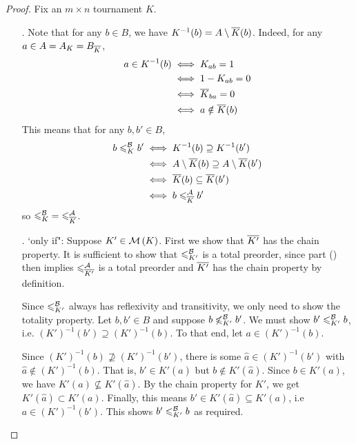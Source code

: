 \begin{proof}
    Fix an $m \times n$ tournament $K$.

    \begin{itemize}
    \item[\labelcref{tourn_item_dual_lemma_nle}.]
    Note that for any $b \in B$, we have $K^{-1}(b) = A \setminus {\overline{K}}(b)$.
    Indeed, for any $a \in A = A_K = B_{{\overline{K}}}$,
    \begin{align*}
        a \in K^{-1}(b)
        &\iff K_{ab} = 1 \\
        &\iff 1 - K_{ab} = 0 \\
        &\iff {\overline{K}}_{ba} = 0 \\
        &\iff a \notin {\overline{K}}(b)
    \end{align*}
    This means that for any $b, b' \in B$,
    \begin{align*}
        b \leqslant^{\mathcal{B}}_K b'
        &\iff K^{-1}(b) \supseteq K^{-1}(b') \\
        &\iff A \setminus {\overline{K}}(b) \supseteq A \setminus {\overline{K}}(b') \\
        &\iff {\overline{K}}(b) \subseteq {\overline{K}}(b') \\
        &\iff b \leqslant^{\mathcal{A}}_{{\overline{K}}} b'
    \end{align*}
    so ${\leqslant^{\mathcal{B}}_K} = {\leqslant^{\mathcal{A}}_{{\overline{K}}}}$.

    \item[\labelcref{tourn_item_dual_lemma_minch}.]
    `only if": Suppose $K' \in \operatorname{\mathcal{M}}\left({K}\right)$. First we show that ${\overline{K'}}$ has
    the chain property. It is sufficient to show that ${\leqslant^{\mathcal{B}}_{K'}}$ is a total
    preorder,\footnotemark{} since part ()
    then implies ${\leqslant^{\mathcal{A}}_{{\overline{K'}}}}$ is a total preorder and ${\overline{K'}}$ has
    the chain property by definition.


    Since ${\leqslant^{\mathcal{B}}_{K'}}$ always has reflexivity and transitivity, we only need
    to show the totality property. Let $b, b' \in B$ and suppose $b
    \not\leqslant^{\mathcal{B}}_{K'} b'$. We must show $b' \leqslant^{\mathcal{B}}_{K'} b$, i.e. $(K')^{-1}(b')
    \supseteq (K')^{-1}(b)$. To that end, let $a \in (K')^{-1}(b)$.

    Since $(K')^{-1}(b) \not\supseteq (K')^{-1}(b')$, there is some $\hat{a}
    \in (K')^{-1}(b')$ with $\hat{a} \notin (K')^{-1}(b)$. That is, $b' \in
    K'(\hat{a})$ but $b \notin K'(\hat{a})$. Since $b \in K'(a)$, we have
    $K'(a) \not\subseteq K'(\hat{a})$. By the chain property for $K'$, we get
    $K'(\hat{a}) \subset K'(a)$. Finally, this means $b' \in K'(\hat{a})
    \subseteq K'(a)$, i.e $a \in (K')^{-1}(b')$. This shows $b' \leqslant^{\mathcal{B}}_{K'} b$
    as required.


\end{itemize}
\end{proof}
